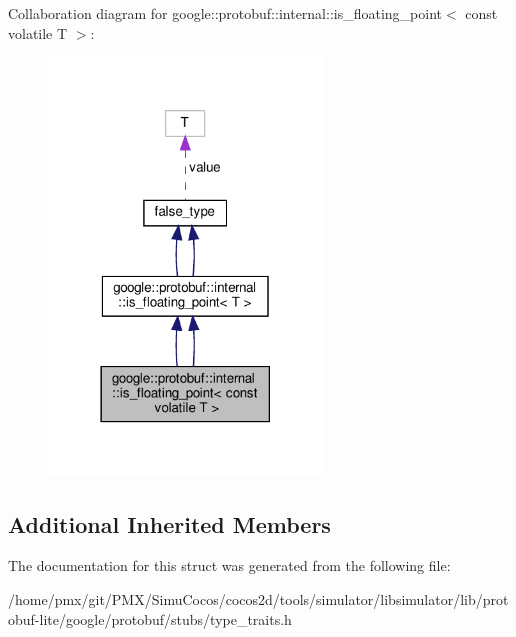 Collaboration diagram for google\+:\+:protobuf\+:\+:internal\+:\+:is\+\_\+floating\+\_\+point$<$ const volatile T $>$\+:
\nopagebreak
\begin{figure}[H]
\begin{center}
\leavevmode
\includegraphics[width=206pt]{structgoogle_1_1protobuf_1_1internal_1_1is__floating__point_3_01const_01volatile_01T_01_4__coll__graph}
\end{center}
\end{figure}
\subsection*{Additional Inherited Members}


The documentation for this struct was generated from the following file\+:\begin{DoxyCompactItemize}
\item 
/home/pmx/git/\+P\+M\+X/\+Simu\+Cocos/cocos2d/tools/simulator/libsimulator/lib/protobuf-\/lite/google/protobuf/stubs/type\+\_\+traits.\+h\end{DoxyCompactItemize}
